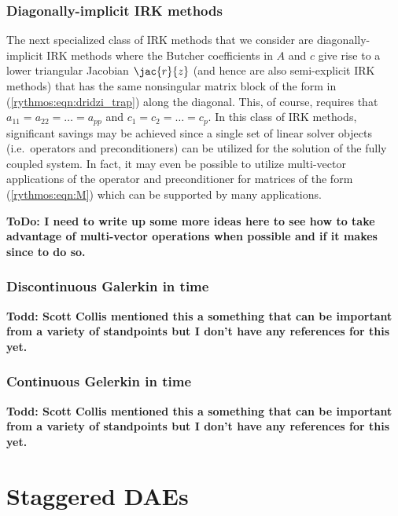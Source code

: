 \documentclass[pdf,ps2pdf,11pt]{SANDreport}
\begin{document}
\subsubsection*{Diagonally-implicit IRK methods}

The next specialized class of IRK methods that we consider are
diagonally-implicit IRK methods where the Butcher coefficients in $A$ and $c$
give rise to a lower triangular Jacobian $\jac{r}{z}$ (and hence are also
semi-explicit IRK methods) that has the same nonsingular matrix block of the
form in (\ref{rythmos:eqn:dridzi_trap}) along the diagonal.  This, of course,
requires that $a_{11} = a_{22} = {}\ldots = a_{pp}$ and $c_{1} = c_{2} =
{}\ldots = c_{p}$.  In this class of IRK methods, significant savings may be
achieved since a single set of linear solver objects (i.e.\ operators and
preconditioners) can be utilized for the solution of the fully coupled system.
In fact, it may even be possible to utilize multi-vector applications of the
operator and preconditioner for matrices of the form (\ref{rythmos:eqn:M})
which can be supported by many applications.

{}\textbf{ToDo: I need to write up some more ideas here to see how to take
advantage of multi-vector operations when possible and if it makes since to do
so.}

\subsubsection{Discontinuous Galerkin in time}

\cite{DGTime}
{}\textbf{Todd: Scott Collis mentioned this a something that can be important
from a variety of standpoints but I don't have any references for this yet.}

\subsubsection{Continuous Gelerkin in time }

\cite{CGTime}
{}\textbf{Todd: Scott Collis mentioned this a something that can be important
from a variety of standpoints but I don't have any references for this yet.}


\section{Staggered DAEs}
\label{rythmos:sec:staggered-daes}
\end{document}
